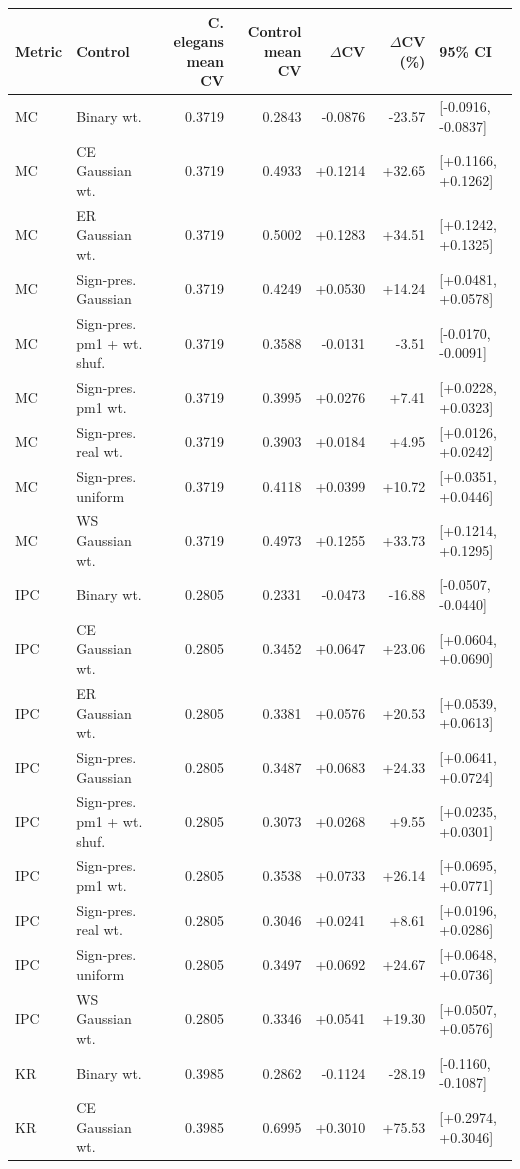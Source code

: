 \begin{tabular}{llrrrrl}
\toprule
Metric & Control & C. elegans mean CV & Control mean CV & $\Delta$CV & $\Delta$CV (\%) & 95\% CI \\
\midrule
MC & Binary wt. & 0.3719 & 0.2843 & -0.0876 & -23.57 & [-0.0916, -0.0837] \\
MC & CE Gaussian wt. & 0.3719 & 0.4933 & +0.1214 & +32.65 & [+0.1166, +0.1262] \\
MC & ER Gaussian wt. & 0.3719 & 0.5002 & +0.1283 & +34.51 & [+0.1242, +0.1325] \\
MC & Sign-pres. Gaussian & 0.3719 & 0.4249 & +0.0530 & +14.24 & [+0.0481, +0.0578] \\
MC & Sign-pres. pm1 + wt. shuf. & 0.3719 & 0.3588 & -0.0131 & -3.51 & [-0.0170, -0.0091] \\
MC & Sign-pres. pm1 wt. & 0.3719 & 0.3995 & +0.0276 & +7.41 & [+0.0228, +0.0323] \\
MC & Sign-pres. real wt. & 0.3719 & 0.3903 & +0.0184 & +4.95 & [+0.0126, +0.0242] \\
MC & Sign-pres. uniform & 0.3719 & 0.4118 & +0.0399 & +10.72 & [+0.0351, +0.0446] \\
MC & WS Gaussian wt. & 0.3719 & 0.4973 & +0.1255 & +33.73 & [+0.1214, +0.1295] \\
IPC & Binary wt. & 0.2805 & 0.2331 & -0.0473 & -16.88 & [-0.0507, -0.0440] \\
IPC & CE Gaussian wt. & 0.2805 & 0.3452 & +0.0647 & +23.06 & [+0.0604, +0.0690] \\
IPC & ER Gaussian wt. & 0.2805 & 0.3381 & +0.0576 & +20.53 & [+0.0539, +0.0613] \\
IPC & Sign-pres. Gaussian & 0.2805 & 0.3487 & +0.0683 & +24.33 & [+0.0641, +0.0724] \\
IPC & Sign-pres. pm1 + wt. shuf. & 0.2805 & 0.3073 & +0.0268 & +9.55 & [+0.0235, +0.0301] \\
IPC & Sign-pres. pm1 wt. & 0.2805 & 0.3538 & +0.0733 & +26.14 & [+0.0695, +0.0771] \\
IPC & Sign-pres. real wt. & 0.2805 & 0.3046 & +0.0241 & +8.61 & [+0.0196, +0.0286] \\
IPC & Sign-pres. uniform & 0.2805 & 0.3497 & +0.0692 & +24.67 & [+0.0648, +0.0736] \\
IPC & WS Gaussian wt. & 0.2805 & 0.3346 & +0.0541 & +19.30 & [+0.0507, +0.0576] \\
KR & Binary wt. & 0.3985 & 0.2862 & -0.1124 & -28.19 & [-0.1160, -0.1087] \\
KR & CE Gaussian wt. & 0.3985 & 0.6995 & +0.3010 & +75.53 & [+0.2974, +0.3046] \\

\end{tabular}
